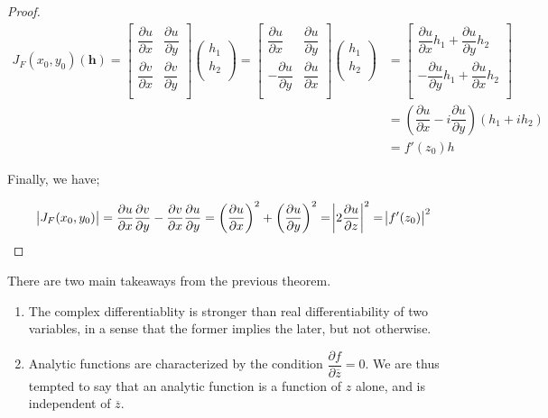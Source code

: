 \documentclass[12pt]{article}
\theoremstyle{definition}
\newenvironment{remark}{
\begin{tcolorbox}[colback=blue!5!white,colframe=blue!75!black,title=Remark, parbox = false] }{\end{tcolorbox} }
\begin{document}
\begin{proof}
\begin{align*}
    J_F(x_0,y_0)(\pmb{h})
    = \begin{bmatrix}
        \dfrac{\partial u}{\partial x} & \dfrac{\partial u}{\partial y}\\[1em]
        \dfrac{\partial v}{\partial x} & \dfrac{\partial v}{\partial y}\\
    \end{bmatrix} \begin{pmatrix}
    h_1 \\ h_2\\
    \end{pmatrix}
    = \begin{bmatrix}
        \dfrac{\partial u}{\partial x} & \dfrac{\partial u}{\partial y}\\[1em]
        -\dfrac{\partial u}{\partial y} & \dfrac{\partial u}{\partial x}\\
    \end{bmatrix} \begin{pmatrix}
    h_1 \\ h_2\\
    \end{pmatrix}
    & = \begin{bmatrix}
        \dfrac{\partial u}{\partial x}h_1 + \dfrac{\partial u}{\partial y}h_2\\[1em]
        -\dfrac{\partial u}{\partial y}h_1 + \dfrac{\partial u}{\partial x}h_2\\
    \end{bmatrix}\\
    & = \left( \dfrac{\partial u}{\partial x} -i\dfrac{\partial u}{\partial y} \right)(h_1+i h_2)\\
    & = f'(z_0) h
\end{align*}


Finally, we have;

\begin{align*}
    \abs{J_F(x_0,y_0)}=\dfrac{\partial u}{\partial x}\dfrac{\partial v}{\partial y}-\dfrac{\partial v}{\partial x}\dfrac{\partial u}{\partial y}=\left(\dfrac{\partial u}{\partial x}\right)^2+\left(\dfrac{\partial u}{\partial y}\right)^2=\abs{2\dfrac{\partial u}{\partial z}}^2
    =\abs{f'(z_0)}^2
\end{align*}
\end{proof}


\begin{remark}
    There are two main takeaways from the previous theorem.
    \begin{enumerate}
        \item The complex differentiablity is stronger than real differentiability of two variables, in a sense that the former implies the later, but not otherwise.
        \item Analytic functions are characterized by the condition $\dfrac{\partial f}{\partial \overline{z}}=0$. We are thus tempted to say that an analytic function is a function of $z$ alone, and is independent of $\overline{z}$.
    \end{enumerate}
\end{remark}
\end{document}
